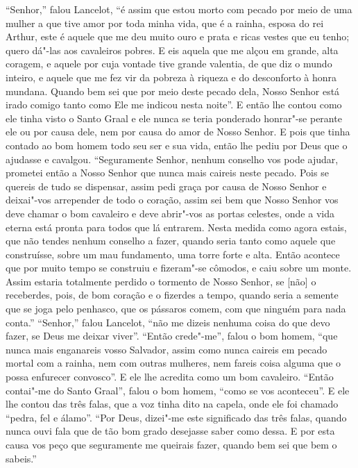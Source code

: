 “Senhor,” falou Lancelot, “é assim que estou morto com pecado por meio de uma
mulher a que tive amor por toda minha vida, que é a rainha, esposa do rei
Arthur, este é aquele que me deu muito ouro e prata e ricas vestes que eu tenho;
quero dá"-las aos cavaleiros pobres. E eis aquela que me alçou em grande, alta
coragem, e aquele por cuja vontade tive grande valentia, de que diz o mundo
inteiro, e aquele que me fez vir da pobreza à riqueza e do desconforto à honra
mundana. Quando bem sei que por meio deste pecado dela, Nosso Senhor
está irado comigo tanto como Ele me indicou nesta noite”. E então lhe contou
como ele tinha visto o Santo Graal e ele nunca se teria ponderado honrar"-se
perante ele ou por causa dele, nem por causa do amor de Nosso Senhor. E pois
que tinha contado ao bom homem todo seu ser e sua vida, então lhe pediu por
Deus que o ajudasse e cavalgou. “Seguramente Senhor, nenhum conselho vos pode
ajudar, prometei então a Nosso Senhor que nunca mais caireis neste pecado. Pois
se quereis de tudo se dispensar, assim pedi graça por causa de Nosso Senhor e
deixai"-vos arrepender de todo o coração, assim sei bem que Nosso Senhor vos
deve chamar o bom cavaleiro e deve abrir"-vos as portas celestes, onde a vida
eterna está pronta para todos que lá entrarem. Nesta medida como agora estais,
que não tendes nenhum conselho a fazer, quando seria tanto como aquele que
construísse, sobre um mau fundamento, uma torre forte e alta. Então acontece
que por muito tempo se construiu e fizeram"-se cômodos, e caiu sobre um monte.
Assim estaria totalmente perdido o tormento de Nosso Senhor, se [não] o
receberdes, pois, de bom coração e o fizerdes a tempo, quando seria a semente
que se joga pelo penhasco, que os pássaros comem, com que ninguém para nada
conta.” “Senhor,” falou Lancelot, ``não me dizeis nenhuma coisa
do que devo fazer, se Deus me deixar viver”. “Então crede"-me”, falou o bom
homem, “que nunca mais enganareis vosso Salvador, assim como nunca caireis em
pecado mortal com a rainha, nem com outras mulheres, nem fareis coisa alguma
que o possa enfurecer convosco”. E ele lhe acredita como um bom cavaleiro. 
“Então contai"-me do Santo Graal”, falou o bom homem, “como se vos
aconteceu”. E ele lhe contou das três falas, que a voz tinha dito na capela,
onde ele foi chamado “pedra, fel e álamo”. “Por Deus, dizei"-me este significado
das três falas, quando nunca ouvi fala que de tão bom grado desejasse saber
como dessa. E por esta causa vos peço que seguramente me queirais fazer, quando
bem sei que bem o sabeis.” 


